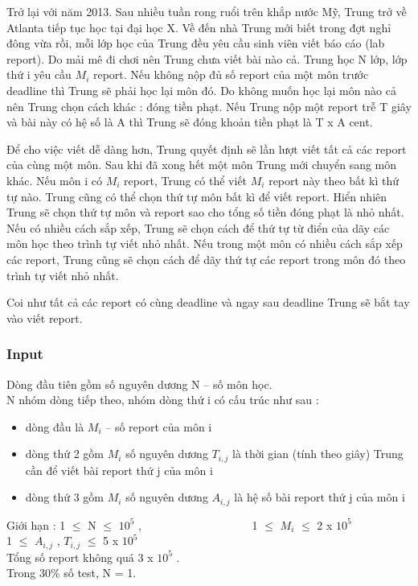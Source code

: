 

Trở lại với năm 2013. Sau nhiều tuần rong ruổi trên khắp nước Mỹ, Trung trở về Atlanta tiếp tục học tại đại học X. Về đến nhà Trung mới biết trong đợt nghỉ đông vừa rồi, mỗi lớp học của Trung đều yêu cầu sinh viên viết báo cáo (lab report). Do mải mê đi chơi nên Trung chưa viết bài nào cả. Trung học N lớp, lớp thứ i yêu cầu $M_{i}$ report. Nếu không nộp đủ số report của một môn trước deadline thì Trung sẽ phải học lại môn đó. Do không muốn học lại môn nào cả nên Trung chọn cách khác : đóng tiền phạt. Nếu Trung nộp một report trễ T giây và bài này có hệ số là A thì Trung sẽ đóng khoản tiền phạt là T x A cent.

Để cho việc viết dễ dàng hơn, Trung quyết định sẽ lần lượt viết tất cả các report của cùng một môn. Sau khi đã xong hết một môn Trung mới chuyển sang môn khác. Nếu môn i có $M_{i}$ report, Trung có thể viết $M_{i}$ report này theo bất kì thứ tự nào. Trung cũng có thể chọn thứ tự môn bất kì để viết report. Hiển nhiên Trung sẽ chọn thứ tự môn và report sao cho tổng số tiền đóng phạt là nhỏ nhất. Nếu có nhiều cách sắp xếp, Trung sẽ chọn cách để thứ tự từ điển của dãy các môn học theo trình tự viết nhỏ nhất. Nếu trong một môn có nhiều cách sắp xếp các report, Trung cũng sẽ chọn cách để dãy thứ tự các report trong môn đó theo trình tự viết nhỏ nhất.

Coi như tất cả các report có cùng deadline và ngay sau deadline Trung sẽ bắt tay vào viết report.

\subsubsection{Input}

Dòng đầu tiên gồm số nguyên dương N – số môn học.
\\N nhóm dòng tiếp theo, nhóm dòng thứ i có cấu trúc như sau :
\begin{itemize}
	\item dòng đầu là $M_{i}$ – số report của môn i
	\item dòng thứ 2 gồm $M_{i}$ số nguyên dương $T_{i,j}$ là thời gian (tính theo giây) Trung cần để viết bài report thứ j của môn i
	\item dòng thứ 3 gồm $M_{i}$ số nguyên dương $A_{i,j}$ là hệ số bài report thứ j của môn i
\end{itemize}

Giới hạn : 1  $\le$  N  $\le$  $10^{5}$ ,                    1  $\le$  $M_{i}$  $\le$  2 x $10^{5}$
\\1  $\le$  $A_{i,j}$ , $T_{i,j}$  $\le$  5 x $10^{5}$
\\Tổng số report không quá 3 x $10^{5}$ .
\\Trong 30\% số test, N = 1.

